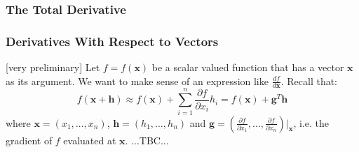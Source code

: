 


%

\subsubsection{The Total Derivative}





\subsubsection{Derivatives With Respect to Vectors}  [very preliminary]
Let $f = f(\mathbf{x})$ be a scalar valued function that has a vector $\mathbf{x}$ as its argument. We want to make sense of an expression like $\frac{d f}{d \mathbf{x}}$. Recall that:
\begin{equation}
f(\mathbf{x + h}) \approx 
f(\mathbf{x}) + \sum_{i=1}^{n} \frac{\partial f}{\partial x_i} h_i =
f(\mathbf{x}) + \mathbf{g}^T \mathbf{h}
\end{equation}
where $\mathbf{x} = (x_1,\ldots,x_n)$, $\mathbf{h} = (h_1,\ldots,h_n)$ and $\mathbf{g} = (\frac{\partial f}{\partial x_1},\ldots,\frac{\partial f}{\partial x_n})|_{\mathbf{x}}$, i.e. the gradient of $f$ evaluated at $\mathbf{x}$. ...TBC...



